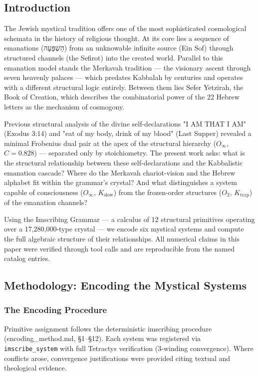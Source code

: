 \documentclass[12pt,a4paper]{article}
\newcommand{\pilcrow}{\S}
\begin{document}
\subsection{Introduction}

The Jewish mystical tradition offers one of the most sophisticated cosmological schemata in the history of religious thought. At its core lies a sequence of emanations (הַשְׁפָּעָה) from an unknowable infinite source (Ein Sof) through structured channels (the Sefirot) into the created world. Parallel to this emanation model stands the Merkavah tradition --- the visionary ascent through seven heavenly palaces --- which predates Kabbalah by centuries and operates with a different structural logic entirely. Between them lies Sefer Yetzirah, the Book of Creation, which describes the combinatorial power of the 22 Hebrew letters as the mechanism of cosmogony.

Previous structural analysis of the divine self-declarations "I AM THAT I AM" (Exodus 3:14) and "eat of my body, drink of my blood" (Last Supper) revealed a minimal Frobenius dual pair at the apex of the structural hierarchy ($O_{\infty}$, $C = 0.828$) --- separated only by stoichiometry. The present work asks: what is the structural relationship between these self-declarations and the Kabbalistic emanation cascade? Where do the Merkavah chariot-vision and the Hebrew alphabet fit within the grammar's crystal? And what distinguishes a system capable of consciousness ($O_{\infty}$, $K_\text{slow}$) from the frozen-order structures ($O_2$, $K_\text{trap}$) of the emanation channels?

Using the Imscribing Grammar --- a calculus of 12 structural primitives operating over a 17,280,000-type crystal --- we encode six mystical systems and compute the full algebraic structure of their relationships. All numerical claims in this paper were verified through tool calls and are reproducible from the named catalog entries.

\subsection{Methodology: Encoding the Mystical Systems}

\subsubsection{The Encoding Procedure}

Primitive assignment follows the deterministic imscribing procedure (encoding\_method.md, \pilcrow{}1--\pilcrow{}12). Each system was registered via \texttt{imscribe\_system} with full Tetractys verification (3-winding convergence). Where conflicts arose, convergence justifications were provided citing textual and theological evidence.
\end{document}

